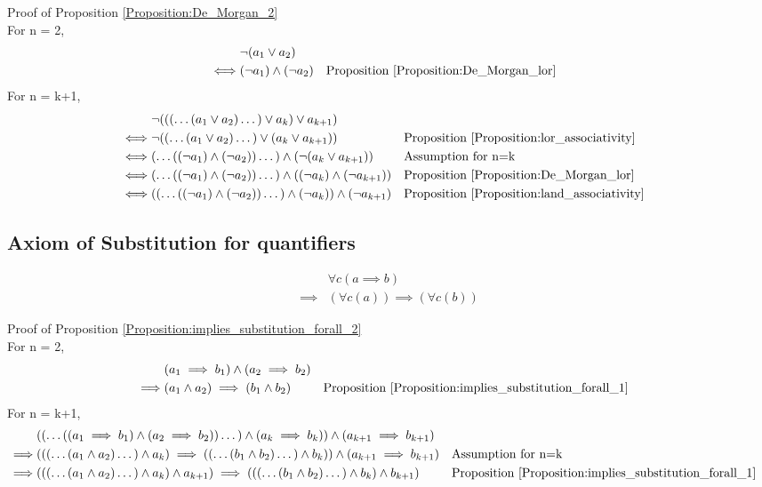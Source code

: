 Proof of Proposition \ref{Proposition:De_Morgan_2} \\
For n = 2,
\begin{align*}
& \lnot (a_1 \lor a_2) \\
\iff & (\lnot a_1) \land (\lnot a_2)
& & \text{Proposition \ref{Proposition:De_Morgan_lor}} \\
\end{align*}
For n = k+1,
\begin{align*}
& \lnot ((( \dots (a_1 \lor a_2) \dots ) \lor a_k ) \lor a_{k+1}) \\
\iff & \lnot (( \dots (a_1 \lor a_2) \dots ) \lor ( a_k \lor a_{k+1}))
& & \text{Proposition \ref{Proposition:lor_associativity}} \\
\iff & ( \dots ((\lnot a_1) \land (\lnot a_2)) \dots ) \land (\lnot (a_k \lor a_{k+1}))
& & \text{Assumption for n=k} \\
\iff & ( \dots ((\lnot a_1) \land (\lnot a_2)) \dots ) \land ((\lnot a_k) \land (\lnot a_{k+1}))
& & \text{Proposition \ref{Proposition:De_Morgan_lor}} \\
\iff & (( \dots ((\lnot a_1) \land (\lnot a_2)) \dots ) \land (\lnot a_k)) \land (\lnot a_{k+1})
& & \text{Proposition \ref{Proposition:land_associativity}} \\
\end{align*}

\subsection{Axiom of Substitution for quantifiers}
\begin{prop}
\label{Proposition:implies_substitution_forall_2}
\begin{align*}
& \forall c (a \implies b) \\
\implies & (\forall c (a)) \implies (\forall c (b))
\end{align*}
\end{prop}

Proof of Proposition \ref{Proposition:implies_substitution_forall_2} \\
For n = 2,
\begin{align*}
& (a_1 \implies b_1) \land (a_2 \implies b_2) \\
\implies & (a_1 \land a_2) \implies (b_1 \land b_2)
& & \text{Proposition \ref{Proposition:implies_substitution_forall_1}} \\
\end{align*}
For n = k+1,
\begin{align*}
& (( \dots ((a_1 \implies b_1) \land (a_2 \implies b_2)) \dots ) \land (a_k \implies b_k)) \land (a_{k+1} \implies b_{k+1}) \\
\implies & ((( \dots (a_1 \land a_2) \dots ) \land a_k) \implies (( \dots (b_1 \land b_2) \dots ) \land b_k)) \land (a_{k+1} \implies b_{k+1})
& & \text{Assumption for n=k} \\
\implies & ((( \dots (a_1 \land a_2) \dots ) \land a_k) \land a_{k+1}) \implies ((( \dots (b_1 \land b_2) \dots ) \land b_k) \land b_{k+1})
& & \text{Proposition \ref{Proposition:implies_substitution_forall_1}} \\
\end{align*}

